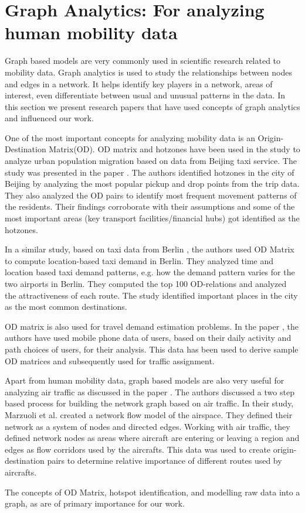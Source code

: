 \section{Graph Analytics: For analyzing human mobility data}
\label{cha:graphrelatedworks}
Graph based models are very commonly used in scientific research related to mobility data. Graph analytics is used to study the relationships between nodes and edges in a network. It helps identify key players in a network, areas of interest, even differentiate between usual and unusual patterns in the data. In this section we present research papers that have used concepts of graph analytics and influenced our work. 

One of the most important concepts for analyzing mobility data is an Origin-Destination Matrix(OD). OD matrix and hotzones have been used in the study to analyze urban population migration based on data from Beijing taxi service. The study was presented in the paper \cite{zhu2013urban}. The authors identified hotzones in the city of Beijing by analyzing the most popular pickup and drop points from the trip data. They also analyzed the OD pairs to identify most frequent movement patterns of the residents. Their findings corroborate with their assumptions and some of the most important areas (key transport facilities/financial hubs) got identified as the hotzones. 

In a similar study, based on taxi data from Berlin \cite{bischoff2015analysis}, the authors used OD Matrix to compute location-based taxi demand in Berlin. They analyzed time and location based taxi demand patterns, e.g. how the demand pattern varies for the two airports in Berlin. They computed the top 100 OD-relations and analyzed the attractiveness of each route. The study identified important places in the city as the most common destinations.


OD matrix is also used for travel demand estimation problems. In the paper \cite{ma2013deriving}, the authors have used mobile phone data of users, based on their daily activity and path choices of users, for their analysis. This data has been used to derive sample OD matrices and subsequently used for traffic assignment.


Apart from human mobility data, graph based models are also very useful for analyzing air traffic as discussed in the paper \cite{marzuoli2011two}. The authors discussed a two step based process for building the network graph based on air traffic. In their study, Marzuoli et al. created a network flow model of the airspace. They defined their network as a system of nodes and directed edges. Working with air traffic, they defined network nodes as areas where aircraft are entering or leaving a region and edges as flow corridors used by the aircrafts. This data was used to create origin-destination pairs to determine relative importance of different routes used by aircrafts.

The concepts of OD Matrix, hotspot identification, and modelling raw data into a graph, as are of primary importance for our work.